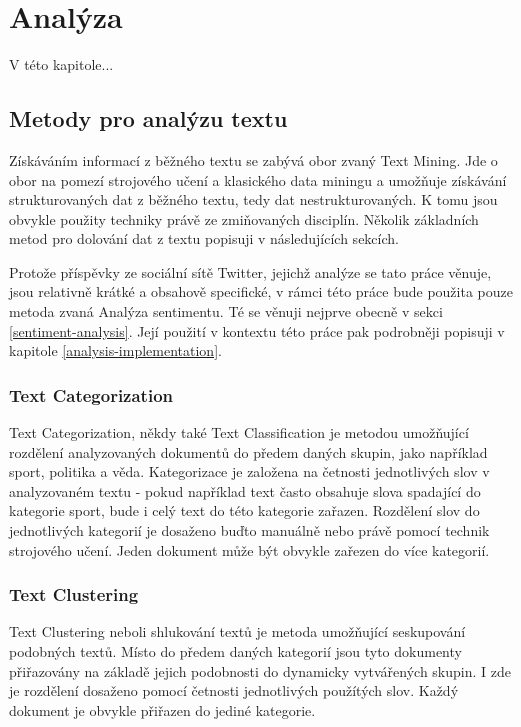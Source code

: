 \documentclass[thesis=B,czech]{FITthesis}[2012/06/26]
\begin{document}




\chapter{Analýza}
V této kapitole... 

\section{Metody pro analýzu textu}
\label{text-mining}
	Získáváním informací z běžného textu se zabývá obor zvaný Text Mining. Jde o obor na pomezí strojového učení a klasického data miningu a umožňuje získávání strukturovaných dat z běžného textu, tedy dat nestrukturovaných. K tomu jsou obvykle použity techniky právě ze zmiňovaných disciplín. Několik základních metod pro dolování dat z textu popisuji v následujících sekcích. 
	
	Protože příspěvky ze sociální sítě Twitter, jejichž analýze se tato práce věnuje, jsou relativně krátké a obsahově specifické, v rámci této práce bude použita pouze metoda zvaná Analýza sentimentu. Té se věnuji nejprve obecně v sekci \ref{sentiment-analysis}. Její použití v kontextu této práce pak podrobněji popisuji v kapitole \ref{analysis-implementation}. 
	
\subsection{Text Categorization}
	Text Categorization, někdy také Text Classification je metodou umožňující rozdělení analyzovaných dokumentů do předem daných skupin, jako například sport, politika a věda. Kategorizace je založena na četnosti jednotlivých slov v analyzovaném textu - pokud například text často obsahuje slova spadající do kategorie sport, bude i celý text do této kategorie zařazen. Rozdělení slov do jednotlivých kategorií je dosaženo buďto manuálně nebo právě pomocí technik strojového učení. Jeden dokument může být obvykle zařezen do více kategorií. 

\subsection{Text Clustering}
	Text Clustering neboli shlukování textů je metoda umožňující seskupování podobných textů. Místo do předem daných kategorií jsou tyto dokumenty přiřazovány na základě jejich podobnosti do dynamicky vytvářených skupin. I zde je rozdělení dosaženo pomocí četnosti jednotlivých použítých slov. Každý dokument je obvykle přiřazen do jediné kategorie. 
\end{document}
